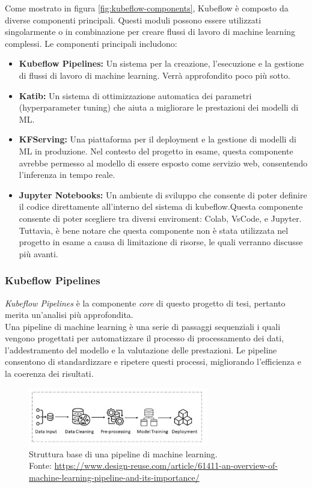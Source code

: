 Come mostrato in figura \ref{fig:kubeflow-components}, Kubeflow è composto da diverse
componenti principali. Questi moduli possono essere utilizzati singolarmente o in combinazione
per creare flussi di lavoro di machine learning complessi. Le componenti principali includono:
\begin{itemize}
   \item \textbf{Kubeflow Pipelines:} Un sistema per la creazione, l'esecuzione e la gestione
   di flussi di lavoro di machine learning. Verrà approfondito poco più sotto.
   \item \textbf{Katib:} Un sistema di ottimizzazione automatica dei parametri (hyperparameter tuning)
   che aiuta a migliorare le prestazioni dei modelli di ML.\@
   \item \textbf{KFServing:} Una piattaforma per il deployment e la gestione di modelli di ML
   in produzione. Nel contesto del progetto in esame, questa componente avrebbe permesso al modello
   di essere esposto come servizio web, consentendo l'inferenza in tempo reale.
   \item \textbf{Jupyter Notebooks:} Un ambiente di sviluppo che consente di poter definire il codice
   direttamente all'interno del sistema di kubeflow.Questa componente consente di poter scegliere tra diversi
   enviroment: Colab, VsCode, e Jupyter. Tuttavia, è bene notare che questa componente
   non è stata utilizzata nel progetto in esame a causa di limitazione di risorse, le quali verranno
   discusse più avanti.
\end{itemize}




\subsubsection{Kubeflow Pipelines}
\textit{Kubeflow Pipelines} è la componente \textit{core} di questo progetto di tesi,
pertanto merita un'analisi più approfondita.\\


Una pipeline di machine learning è una serie di passaggi sequenziali i quali vengono
progettati per automatizzare il processo di processamento dei dati, l'addestramento del modello
e la valutazione delle prestazioni. Le pipeline consentono di standardizzare e ripetere
questi processi, migliorando l'efficienza e la coerenza dei risultati.


\begin{figure}[H]
   \centering
   \includegraphics[width=0.7\textwidth]{images/overview-ml-pipeline-structure.jpg}
       \caption{Struttura base di una pipeline di machine learning.\\
       Fonte: \url{https://www.design-reuse.com/article/61411-an-overview-of-machine-learning-pipeline-and-its-importance/}}
   \label{fig:ml-pipeline-structure}
\end{figure}



